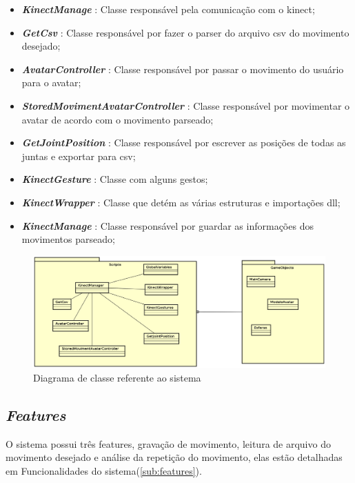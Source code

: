 \begin{itemize}
  \item \textit{\textbf{KinectManage}} : Classe responsável pela comunicação com o kinect;
  \item \textit{\textbf{GetCsv}} : Classe responsável por fazer o parser do arquivo csv do movimento desejado;
  \item \textit{\textbf{AvatarController}} : Classe responsável por passar o movimento do usuário para o avatar;
  \item \textit{\textbf{StoredMovimentAvatarController}} : Classe responsável por movimentar o avatar de acordo com o movimento parseado;
  \item \textit{\textbf{GetJointPosition}} : Classe responsável por escrever as posições de todas as juntas e exportar para csv;
  \item \textit{\textbf{KinectGesture}} : Classe com alguns gestos;
  \item \textit{\textbf{KinectWrapper}} : Classe que detém as várias estruturas e importações dll;
  \item \textit{\textbf{KinectManage}} : Classe responsável por guardar as informações dos movimentos parseado;
\end{itemize}


  \begin{figure}[!h]
  \centering
  \includegraphics [keepaspectratio=true,scale=0.45]{figuras/DiagramaDeClasse.eps}

  \caption{Diagrama de classe referente ao sistema}
  \label{diagramaClasse}
  \end{figure}


\subsection{\textit{Features}}\label{sub:solFeatures}
  O sistema possui três features, gravação de movimento, leitura de arquivo do movimento desejado e análise da repetição do movimento, elas estão
detalhadas em Funcionalidades do sistema(\ref{sub:features}).

